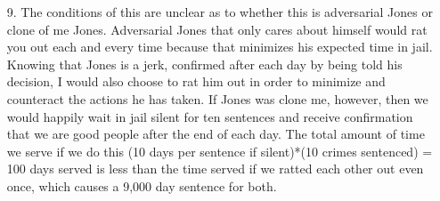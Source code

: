 \documentclass{article}
\begin{document}
\begin{enumerate}
\bigskip

\item[9.] The conditions of this are unclear as to whether this is adversarial Jones or clone of me Jones. Adversarial Jones that only cares about himself would rat you out each and every time because that minimizes his expected time in jail. Knowing that Jones is a jerk, confirmed after each day by being told his decision, I would also choose to rat him out in order to minimize and counteract the actions he has taken. If Jones was clone me, however, then we would happily wait in jail silent for ten sentences and receive confirmation that we are good people after the end of each day. The total amount of time we serve if we do this (10 days per sentence if silent)*(10 crimes sentenced) = 100 days served is less than the time served if we ratted each other out even once, which causes a 9,000 day sentence for both.

\end{enumerate}
\end{document}
